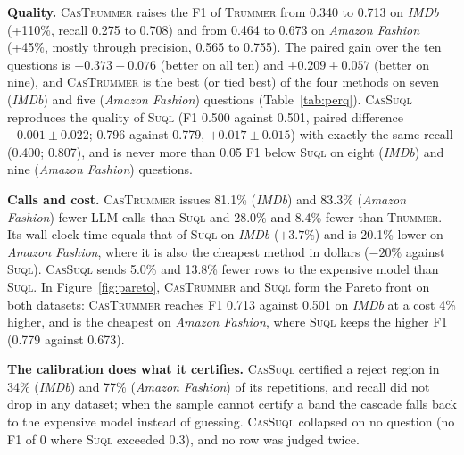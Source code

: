 \documentclass[sigconf]{acmart}
\begin{document}
\textbf{Quality.} \textsc{CasTrummer} raises the F1 of \textsc{Trummer} from 0.340 to 0.713 on \textit{IMDb} (+110\%, recall 0.275 to 0.708) and from 0.464 to 0.673 on \textit{Amazon Fashion} (+45\%, mostly through precision, 0.565 to 0.755). The paired gain over the ten questions is $+0.373\pm0.076$ (better on all ten) and $+0.209\pm0.057$ (better on nine), and \textsc{CasTrummer} is the best (or tied best) of the four methods on seven (\textit{IMDb}) and five (\textit{Amazon Fashion}) questions (Table~\ref{tab:perq}). \textsc{CasSuql} reproduces the quality of \textsc{Suql} (F1 0.500 against 0.501, paired difference $-0.001\pm0.022$; 0.796 against 0.779, $+0.017\pm0.015$) with exactly the same recall (0.400; 0.807), and is never more than 0.05 F1 below \textsc{Suql} on eight (\textit{IMDb}) and nine (\textit{Amazon Fashion}) questions.

\textbf{Calls and cost.} \textsc{CasTrummer} issues 81.1\% (\textit{IMDb}) and 83.3\% (\textit{Amazon Fashion}) fewer LLM calls than \textsc{Suql} and 28.0\% and 8.4\% fewer than \textsc{Trummer}. Its wall-clock time equals that of \textsc{Suql} on \textit{IMDb} ($+3.7\%$) and is 20.1\% lower on \textit{Amazon Fashion}, where it is also the cheapest method in dollars ($-20\%$ against \textsc{Suql}). \textsc{CasSuql} sends 5.0\% and 13.8\% fewer rows to the expensive model than \textsc{Suql}. In Figure~\ref{fig:pareto}, \textsc{CasTrummer} and \textsc{Suql} form the Pareto front on both datasets: \textsc{CasTrummer} reaches F1 0.713 against 0.501 on \textit{IMDb} at a cost 4\% higher, and is the cheapest on \textit{Amazon Fashion}, where \textsc{Suql} keeps the higher F1 (0.779 against 0.673).

\textbf{The calibration does what it certifies.} \textsc{CasSuql} certified a reject region in 34\% (\textit{IMDb}) and 77\% (\textit{Amazon Fashion}) of its repetitions, and recall did not drop in any dataset; when the sample cannot certify a band the cascade falls back to the expensive model instead of guessing. \textsc{CasSuql} collapsed on no question (no F1 of 0 where \textsc{Suql} exceeded 0.3), and no row was judged twice.
\end{document}
